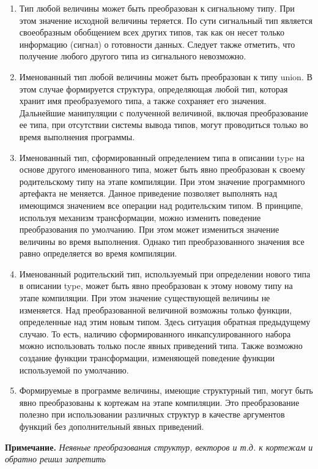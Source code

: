 {\begin{enumerate}
    \item Тип любой величины может быть преобразован к сигнальному типу. При этом значение исходной величины теряется. По сути сигнальный тип является своеобразным обобщением всех других типов, так как он несет только информацию (сигнал) о готовности данных. Следует также отметить, что получение любого другого типа из сигнального невозможно.
    \item Именованный тип любой величины может быть преобразован к типу union. В этом случае формируется структура, определяющая любой тип, которая хранит имя преобразуемого типа, а также сохраняет его значения. Дальнейшие манипуляции с полученной величиной, включая преобразование ее типа, при отсутствии системы вывода типов, могут проводиться только во время выполнения программы.
    \item Именованный тип, сформированный определением типа в описании type на основе другого именованного типа, может быть явно преобразован к своему родительскому типу на этапе компиляции. При этом значение программного артефакта не меняется. Данное приведение позволяет выполнять над имеющимся значением все операции над родительским типом. В принципе, используя механизм трансформации, можно изменить поведение преобразования по умолчанию. При этом может измениться значение величины во время выполнения. Однако тип преобразованного значения все равно определяется во время компиляции.
    \item Именованный родительский тип, используемый при определении нового типа в описании type, может быть явно преобразован к этому новому типу на этапе компиляции. При этом значение существующей величины не изменяется. Над преобразованной величиной возможны только функции, определенные над этим новым типом. Здесь ситуация обратная предыдущему случаю. То есть, наличию сформированного инкапсулированного набора можно использовать только после явных приведений типа. Также возможно создание функции трансформации, изменяющей поведение функции используемой по умолчанию.
    \item Формируемые в программе величины, имеющие структурный тип, могут быть явно преобразованы к кортежам на этапе компиляции. Это преобразование полезно при использовании различных структур в качестве аргументов функций без дополнительный явных приведений.
\end{enumerate}

\textbf{Примечание.}
\textit{Неявные преобразования структур, векторов и т.д. к кортежам и обратно решил запретить}

}
